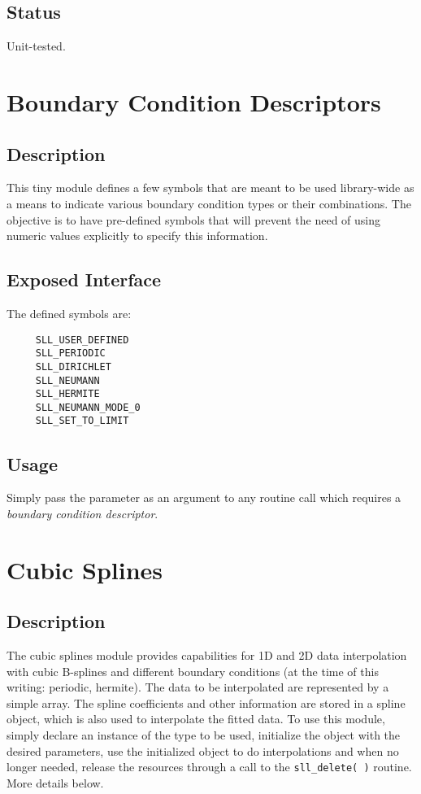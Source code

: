 \documentclass[]{report}   %
\begin{document}
\subsection{Status}
Unit-tested.






\section{Boundary Condition Descriptors}

\subsection{Description}
This tiny module defines a few symbols that are meant to be used library-wide as a means to indicate various boundary condition types or their combinations. The objective is to have pre-defined symbols that will prevent the need of using numeric values explicitly to specify this information.

\subsection{Exposed Interface}
The defined symbols are:

\begin{verbatim}
     SLL_USER_DEFINED
     SLL_PERIODIC
     SLL_DIRICHLET
     SLL_NEUMANN 
     SLL_HERMITE 
     SLL_NEUMANN_MODE_0
     SLL_SET_TO_LIMIT 
\end{verbatim}

\subsection{Usage}
Simply pass the parameter as an argument to any routine call which requires a \emph{boundary condition descriptor}.





\section{Cubic Splines}

\subsection{Description}
The cubic splines module provides capabilities for 1D and 2D data interpolation with cubic B-splines and different boundary conditions (at the time of this writing: periodic, hermite). The data to be interpolated are represented by a simple array.  The spline coefficients and other information are stored in a spline object, which is also used to interpolate the fitted data. To use this module, simply declare an instance of the type to be used, initialize the object with the desired parameters, use the initialized object to do interpolations and when no longer needed, release the resources through a call to the \verb+sll_delete( )+ routine. More details below.
\end{document}

